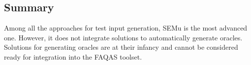 



%
%
%

\subsection{Summary}

Among all the approaches for test input generation, SEMu is the most advanced one. However, it does not integrate solutions to automatically generate oracles. Solutions for generating oracles are at their infancy and cannot be considered ready for integration into the FAQAS toolset.



